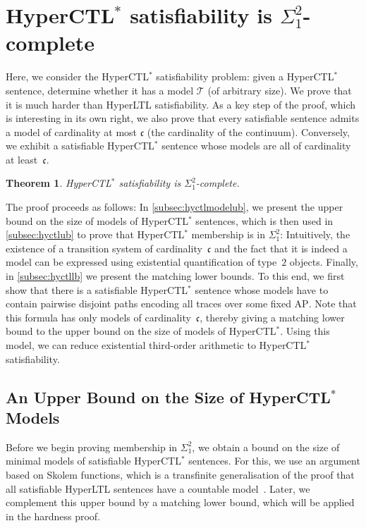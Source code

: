 \documentclass[dvipsnames,10pt,a4paper]{amsart}
\newtheorem{thm}{Theorem}[section]
\theoremstyle{definition}
\theoremstyle{remark}
\newcommand{\contcard}{\cont}
\newcommand{\cont}{\mathfrak{c}}
\newcommand{\tsys}{\mathcal{T}}
\newcommand{\hyltl}{{HyperLTL}\xspace}
\newcommand{\hyctlstar}{{HyperCTL$^*$}\xspace}
\newcommand{\ap}[0]{\mathrm{AP}}
\begin{document}
\section{\texorpdfstring{\hyctlstar}{HyperCTL*} satisfiability is \texorpdfstring{$\Sigma^2_1$}{Sigma21}-complete}
\label{sec:ctlsat}

Here, we consider the \hyctlstar satisfiability problem: given a \hyctlstar sentence, determine whether it has a model $\tsys$ (of arbitrary size). We prove that it is much harder than \hyltl satisfiability.
As a key step of the proof, which is interesting in its own right, we also prove that every satisfiable sentence
admits a model of cardinality at most $\cont$ (the cardinality of the continuum). Conversely, we exhibit
a satisfiable \hyctlstar sentence whose models are all of cardinality at least~$\cont$.


\begin{thm}\label{thm:hyctl-sat}
  \hyctlstar satisfiability is $\Sigma^2_1$-complete.
\end{thm}



The proof proceeds as follows: In \autoref{subsec:hyctlmodelub}, we present the upper bound on the size of models of \hyctlstar sentences, which is then used in \autoref{subsec:hyctlub} to prove that \hyctlstar membership is in $\Sigma^2_1$: Intuitively, the existence of a transition system of cardinality~$\cont$ and the fact that it is indeed a model can be expressed using existential quantification of type~$2$ objects.
Finally, in \autoref{subsec:hyctllb} we present the matching lower bounds.
To this end, we first show that there is a satisfiable \hyctlstar sentence whose models have to contain pairwise disjoint paths encoding all traces over some fixed $\ap$. Note that this formula has only models of cardinality~$\contcard$, thereby giving a matching lower bound to the upper bound on the size of models of \hyctlstar.
Using this model, we can reduce existential third-order arithmetic to \hyctlstar satisfiability.

\subsection{An Upper Bound on the Size of \texorpdfstring{\hyctlstar}{HyperCTL*} Models}
\label{subsec:hyctlmodelub}
Before we begin proving membership in $\Sigma^2_1$, we obtain a bound on the size of minimal models of satisfiable \hyctlstar sentences. For this, we use an argument based on Skolem functions, which is a transfinite generalisation of the proof that all satisfiable \hyltl sentences have a countable model~\cite{FZ17}.
Later, we complement this upper bound by a matching lower bound, which will be applied in the hardness proof.
\end{document}
